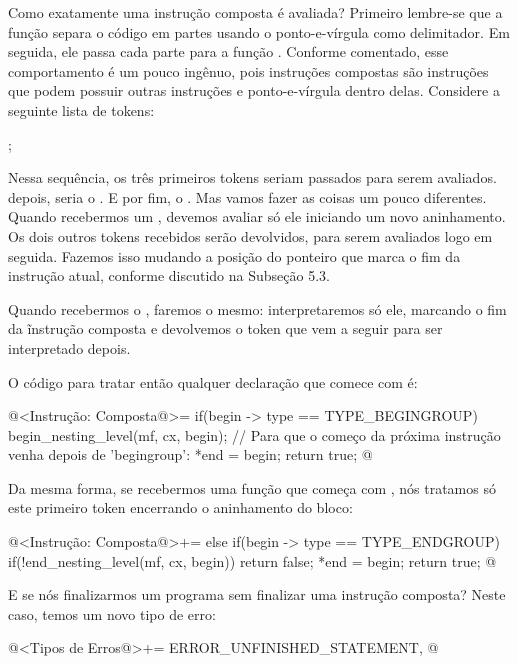 
Como exatamente uma instrução composta é avaliada? Primeiro lembre-se
que a função  separa o código
em partes usando o ponto-e-vírgula como delimitador. Em seguida, ele
passa cada parte para a função . Conforme
comentado, esse comportamento é um pouco ingênuo, pois instruções
compostas são instruções que podem possuir outras instruções e
ponto-e-vírgula dentro delas. Considere a seguinte lista
de tokens:

\alinhaverbatim
[begingroup][T1][T2][;][T3][T4][;][endgroup][T5];
\alinhanormal

Nessa sequência, os três primeiros tokens seriam passados para serem
avaliados. depois, seria o \monoespaco{[T3][T4]}. E por fim,
o \monoespaco{[endgroup]}. Mas vamos fazer as coisas um pouco
diferentes. Quando recebermos um \monoespaco{[begingroup][T5]},
devemos avaliar só ele iniciando um novo aninhamento. Os dois outros
tokens recebidos serão devolvidos, para serem avaliados logo em
seguida. Fazemos isso mudando a posição do ponteiro que marca o fim da
instrução atual, conforme discutido na Subseção 5.3.

Quando recebermos o , faremos o mesmo:
interpretaremos só ele, marcando o fim da ĩnstrução composta e
devolvemos o token que vem a seguir para ser interpretado depois.

O código para tratar então qualquer declaração que comece
com  é:

\iniciocodigo
@<Instrução: Composta@>=
if(begin -> type == TYPE_BEGINGROUP){
  begin_nesting_level(mf, cx, begin);
  // Para que o começo da próxima instrução venha depois de 'begingroup':
  *end = begin;
  return true;
}
@
\fimcodigo

Da mesma forma, se recebermos uma função que começa
com , nós tratamos só este primeiro token
encerrando o aninhamento do bloco:

\iniciocodigo
@<Instrução: Composta@>+=
else if(begin -> type == TYPE_ENDGROUP){
  if(!end_nesting_level(mf, cx, begin))
    return false;
  *end = begin;
  return true;
}
@
\fimcodigo

E se nós finalizarmos um programa sem finalizar uma instrução
composta? Neste caso, temos um novo tipo de erro:

\iniciocodigo
@<Tipos de Erros@>+=
ERROR_UNFINISHED_STATEMENT,
@
\fimcodigo

